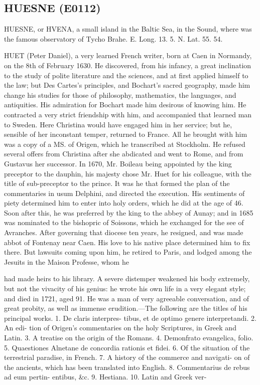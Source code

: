 \documentclass{article}
\begin{document}
\subsection*{HUESNE (E0112)}
HUESNE, or HVENA, a small island in the Baltic Sea, in the Sound, where was the famous observatory of Tycho Brahe. E. Long. 13. 5. N. Lat. 55. 54.

HUET (Peter Daniel), a very learned French writer, born at Caen in Normandy, on the 8th of February 1630. He discovered, from his infancy, a great inclination to the study of polite literature and the sciences, and at first applied himself to the law; but Des Cartes's principles, and Bochart's sacred geography, made him change his studies for those of philosophy, mathematics, the languages, and antiquities. His admiration for Bochart made him desirous of knowing him. He contracted a very strict friendship with him, and accompanied that learned man to Sweden. Here Christina would have engaged him in her service; but he, sensible of her inconstant temper, returned to France. All he brought with him was a copy of a MS. of Origen, which he transcribed at Stockholm. He refused several offers from Christina after she abdicated and went to Rome, and from Gustavus her successor. In 1670, Mr. Boileau being appointed by the king preceptor to the dauphin, his majesty chose Mr. Huet for his colleague, with the title of sub-preceptor to the prince. It was he that formed the plan of the commentaries in usum Delphini, and directed the execution. His sentiments of piety determined him to enter into holy orders, which he did at the age of 46. Soon after this, he was preferred by the king to the abbey of Aunay; and in 1685 was nominated to the bishopric of Soissons, which he exchanged for the see of Avranches. After governing that diocese ten years, he resigned, and was made abbot of Fontenay near Caen. His love to his native place determined him to fix there. But lawsuits coming upon him, he retired to Paris, and lodged among the Jesuits in the Maison Professe, whom he

had made heirs to his library. A severe distemper
weakened his body extremely, but not the vivacity of
his genius: he wrote his own life in a very elegant
style; and died in 1721, aged 91. He was a man of
very agreeable conversation, and of great probity, as
well as immense erudition.—The following are the
titles of his principal works. 1. De claris interpres-
tibus, et de optimo genere interpretandi. 2. An edi-
tion of Origen's commentaries on the holy Scriptures,
in Greek and Latin. 3. A treatise on the origin
of the Romans. 4. Demonfrato evangelica, folio.
5. Quaestiones Alnetane de concordia rationis et fidei.
6. Of the situation of the terrestrial paradise, in
French. 7. A history of the commerce and navigati-
on of the ancients, which has been translated into
English. 8. Commentarius de rebus ad eum pertin-
entibus, \&c. 9. Hestiana. 10. Latin and Greek ver-
\end{document}
